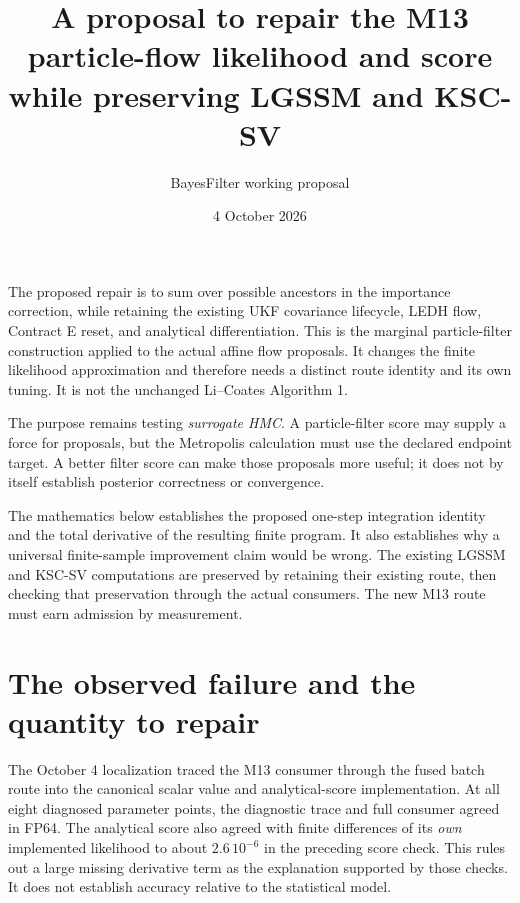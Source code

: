 \documentclass[11pt]{article}
\title{A proposal to repair the M13 particle-flow likelihood and score\\
while preserving LGSSM and KSC-SV}
\author{BayesFilter working proposal}
\date{4 October 2026}
\begin{document}
\maketitle

The proposed repair is to sum over possible ancestors in the importance
correction, while retaining the existing UKF covariance lifecycle, LEDH flow,
Contract E reset, and analytical differentiation. This is the marginal
particle-filter construction applied to the actual affine flow proposals.
It changes the finite likelihood approximation and therefore needs a distinct
route identity and its own tuning. It is not the unchanged Li--Coates
Algorithm 1.

The purpose remains testing \emph{surrogate HMC}. A particle-filter score may
supply a force for proposals, but the Metropolis calculation must use the
declared endpoint target. A better filter score can make those proposals more
useful; it does not by itself establish posterior correctness or convergence.

The mathematics below establishes the proposed one-step integration identity
and the total derivative of the resulting finite program. It also establishes
why a universal finite-sample improvement claim would be wrong. The existing
LGSSM and KSC-SV computations are preserved by retaining their existing route,
then checking that preservation through the actual consumers. The new M13
route must earn admission by measurement.

\section{The observed failure and the quantity to repair}

The October 4 localization traced the M13 consumer through the fused batch
route into the canonical scalar value and analytical-score implementation.
At all eight diagnosed parameter points, the diagnostic trace and full
consumer agreed in FP64. The analytical score also agreed with finite
differences of its \emph{own} implemented likelihood to about
$2.6\,10^{-6}$ in the preceding score check. This rules out a large missing
derivative term as the explanation supported by those checks. It does not
establish accuracy relative to the statistical model.
\end{document}
